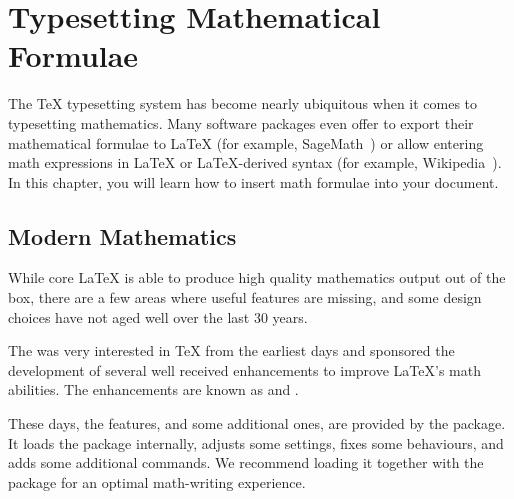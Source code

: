 %
%
%
%


\chapter{Typesetting Mathematical Formulae}\label{chap:math}

\begin{intro}
  The \TeX{} typesetting system has become nearly ubiquitous when it comes to
  typesetting mathematics. Many software packages even offer to export their
  mathematical formulae to \LaTeX{} (for example, SageMath~\cite{sagemath}) or
  allow entering math expressions in \LaTeX{} or \LaTeX{}-derived syntax (for
  example, Wikipedia~\cite{enwiki:1091087776}). In this chapter, you will learn
  how to insert math formulae into your document.
\end{intro}

\section{Modern Mathematics}

While core \LaTeX{} is able to produce high quality mathematics output out of
the box, there are a few areas where useful features are missing, and some
design choices have not aged well over the last 30 years.

The \emph{} was very interested in \TeX{} from
the earliest days and sponsored the development of several well received
enhancements to improve \LaTeX{}'s math abilities. The enhancements are known as
 and .

These days, the  features, and some additional ones, are
provided by the  package. It loads the  package
internally, adjusts some settings, fixes some behaviours, and adds some
additional commands. We recommend loading it together with the
 package for an optimal math-writing experience.

